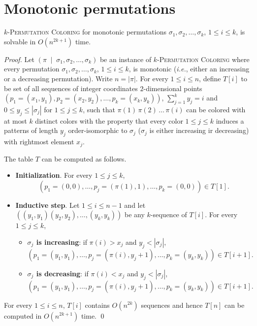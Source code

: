 \section{Monotonic permutations}
\label{section:Monotonic permutations}

\begin{proposition}
  \label{proposition:Monotonic Permutation Coloring}
  \textsc{$k$-Permutation Coloring} for monotonic permutations
  $\sigma_1, \sigma_2, \dots, \sigma_k$, $1 \leq i \leq k$, is
  solvable in $O(n^{2k+1})$ time.
\end{proposition}

\begin{proof}
  Let $(\pi \;\mid\; \sigma_1, \sigma_2, \dots, \sigma_k)$ be an instance
  of \textsc{$k$-Permutation Coloring} where every permutation
  $\sigma_1, \sigma_2, \dots, \sigma_k$, $1 \leq i \leq k$, is
  monotonic (\emph{i.e.}, either an increasing or a decreasing permutation).
  Write $n = |\pi|$.
  For every $1 \leq i \leq n$, define $T[i]$ to be set of all sequences of
  integer coordinates $2$-dimensional points
  $(p_1=(x_1, y_1), p_2=(x_2, y_2), \dots, p_k=(x_k, y_k))$,
  $\sum_{j=1}^{k} y_j = i$ and $0 \leq y_j \leq |\sigma_j|$ for $1 \leq j \leq k$,
  such that
  $\pi(1) \, \pi(2) \, \dots \, \pi(i)$ can be colored with at most $k$
  distinct colors
  with the property that every color $1 \leq j \leq k$ induces a patterns of length $y_j$
  order-isomorphic to $\sigma_j$ ($\sigma_j$ is either increasing ir decreasing)
  with rightmost element $x_j$.

  The table $T$ can be computed as follows.
  \begin{itemize}
    \item \textbf{Initialization}.
    For every $1 \leq j \leq k$,
    $$(p_1=(0,0), \dots, p_j=(\pi(1), 1), \dots, p_k=(0,0)) \in T[1]\text{.}$$

    \item \textbf{Inductive step}.
    Let $1 \leq i \leq n-1$ and
    let $((y_1, y_1) (y_2, y_2), \dots, (y_k, y_k))$ be any $k$-sequence of
    $T[i]$.
    For every $1 \leq j \leq k$,
    \begin{itemize}
      \item \textbf{$\sigma_j$ is increasing}:
      if $\pi(i) > x_j$ and $y_j < |\sigma_j|$,
      $$(p_1=(y_1, y_1), \dots, p_j=(\pi(i), y_j+1), \dots, p_k=(y_k, y_k)) \in T[i+1]\text{.}$$
      \item \textbf{$\sigma_j$ is decreasing}:
      if $\pi(i) < x_j$ and $y_j < |\sigma_j|$,
      $$(p_1=(y_1, y_1), \dots, p_j=(\pi(i), y_j+1), \dots, p_k=(y_k, y_k)) \in T[i+1]\text{.}$$
    \end{itemize}
  \end{itemize}

  For every $1 \leq i \leq n$, $T[i]$ contains $O(n^{2k})$ sequences and hence
  $T[n]$ can be computed in $O(n^{2k+1})$ time.
  \qed
\end{proof}

